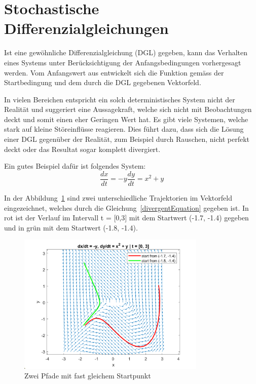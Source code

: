 %
%
%
%
\section{Stochastische Differenzialgleichungen\label{brown:SDGL}}

Ist eine gewöhnliche Differenzialgleichung (DGL) gegeben, kann das Verhalten eines Systems unter Berücksichtigung der Anfangsbedingungen vorhergesagt werden. Vom Anfangswert aus entwickelt sich die Funktion gemäss der Startbedingung und dem durch die DGL gegebenen Vektorfeld. %

In vielen Bereichen entspricht ein solch deterministisches System  nicht der Realität und suggeriert eine Aussagekraft, welche sich nicht mit Beobachtungen deckt und somit einen eher Geringen Wert hat. Es gibt viele Systemen, welche stark auf kleine Störeinflüsse reagieren. Dies führt dazu, dass sich die Lösung einer DGL gegenüber der Realität, zum Beispiel durch Rauschen, nicht perfekt deckt oder das Resultat sogar komplett divergiert.

Ein gutes Beispiel dafür ist folgendes System:
\begin{equation}
	\frac{dx}{dt} = - y
	\frac{dy}{dt} = x^2 + y
	\label{divergentEquation}
\end{equation}

In der Abbildung~\ref{divergentAndConvergentSystem} sind zwei unterschiedliche Trajektorien im Vektorfeld eingezeichnet, welches durch die Gleichung~\ref{divergentEquation} gegeben ist. In rot ist der Verlauf im Intervall  t = [0,3] mit dem Startwert (-1.7, -1.4) gegeben und in grün mit dem Startwert (-1.8, -1.4).

\begin{figure}
	\centering
	\includegraphics[width=0.8\textwidth]{papers/brown/images/Vektorfeld-mit-zwei-Pfaden.png}
	\caption{Zwei Pfade mit fast gleichem Startpunkt}
	\label{divergentAndConvergentSystem}
\end{figure}

